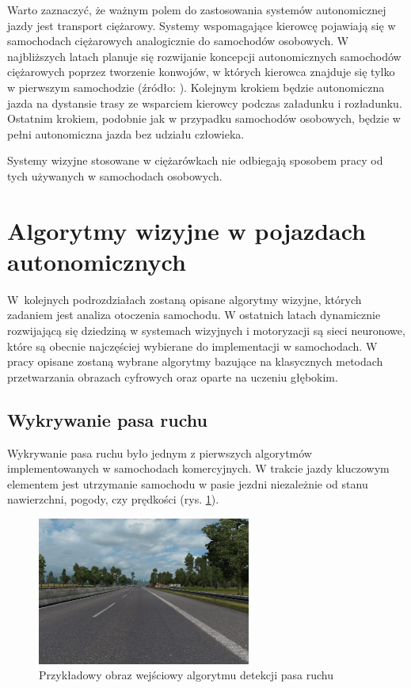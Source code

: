 Warto zaznaczyć, że ważnym polem do zastosowania systemów autonomicznej jazdy jest transport ciężarowy. 
Systemy wspomagające kierowcę pojawiają się w samochodach ciężarowych analogicznie do samochodów osobowych. 
W najbliższych latach planuje się rozwijanie koncepcji autonomicznych samochodów ciężarowych poprzez tworzenie konwojów, w których kierowca znajduje się tylko w pierwszym samochodzie (źródło: \cite{W4}).
Kolejnym krokiem będzie autonomiczna jazda na dystansie trasy ze wsparciem kierowcy podczas załadunku i rozładunku. 
Ostatnim krokiem, podobnie jak w przypadku samochodów osobowych, będzie w pełni autonomiczna jazda bez udziału człowieka.

Systemy wizyjne stosowane w ciężarówkach nie odbiegają sposobem pracy od tych używanych w samochodach osobowych.



\section{Algorytmy wizyjne w pojazdach autonomicznych}

W~kolejnych podrozdziałach zostaną opisane algorytmy wizyjne, których zadaniem jest analiza otoczenia samochodu. 
W ostatnich latach dynamicznie rozwijającą się dziedziną w systemach wizyjnych i motoryzacji są sieci neuronowe, które są obecnie najczęściej wybierane do implementacji w samochodach. 
W pracy opisane zostaną wybrane algorytmy bazujące na klasycznych metodach przetwarzania obrazach cyfrowych oraz oparte na uczeniu głębokim. 

\subsection{Wykrywanie pasa ruchu}

\label{sec:lane_detection}

Wykrywanie pasa ruchu było jednym z pierwszych algorytmów implementowanych w samochodach komercyjnych. 
W trakcie jazdy kluczowym elementem jest utrzymanie samochodu w pasie jezdni niezależnie od stanu nawierzchni, pogody, czy prędkości (rys. \ref{fig:inputimg1}).

\begin{figure}
  \centering
  \includegraphics[width=7cm]{img/input.png}
  \caption{Przykładowy obraz wejściowy algorytmu detekcji pasa ruchu}
  \label{fig:inputimg1}
  \end{figure}

